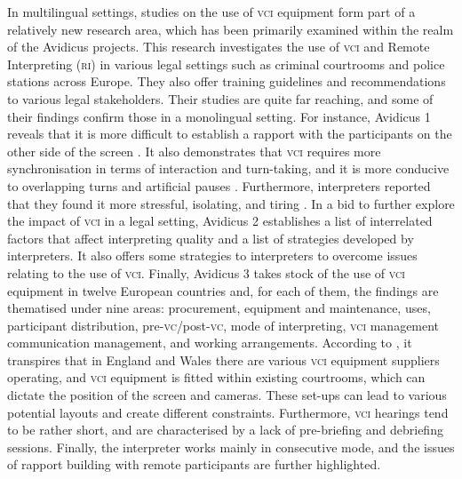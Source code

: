 \documentclass[output=paper]{langsci/langscibook}
\begin{document}
In multilingual settings, studies on the use of \textsc{vci} equipment form part of a relatively new research area, which has been primarily examined within the realm of the Avidicus projects. This research investigates the use of \textsc{vci} and Remote Interpreting (\textsc{ri}) in various legal settings such as criminal courtrooms and police stations across Europe. They also offer training guidelines and recommendations to various legal stakeholders. Their studies are quite far reaching, and some of their findings confirm those in a monolingual setting. For instance, Avidicus 1 reveals that it is more difficult to establish a rapport with the participants on the other side of the screen \citep{Rombouts2011}. It also demonstrates that \textsc{vci} requires more synchronisation in terms of interaction and turn-taking, and it is more conducive to overlapping turns and artificial pauses \citep{Balogh2011}. Furthermore, interpreters reported that they found it more stressful, isolating, and tiring \citep{Miler-Cassino2011}. In a bid to further explore the impact of \textsc{vci} in a legal setting, Avidicus 2 establishes a list of interrelated factors that affect interpreting quality and a list of strategies developed by interpreters. It also offers some strategies to interpreters to overcome issues relating to the use of \textsc{vci}. Finally, Avidicus 3 takes stock of the use of \textsc{vci} equipment in twelve European countries and, for each of them, the findings are thematised under nine areas: procurement, equipment and maintenance, uses, participant distribution, pre-\textsc{vc}/post-\textsc{vc}, mode of interpreting, \textsc{vci} management communication management, and working arrangements. According to \citet{Braun2016a}, it transpires that in England and Wales there are various \textsc{vci} equipment suppliers operating, and \textsc{vci} equipment is fitted within existing courtrooms, which can dictate the position of the screen and cameras. These set-ups can lead to various potential layouts and create different constraints. Furthermore, \textsc{vci} hearings tend to be rather short, and are characterised by a lack of pre-briefing and debriefing sessions. Finally, the interpreter works mainly in consecutive mode, and the issues of rapport building with remote participants are further highlighted. 
\end{document}
